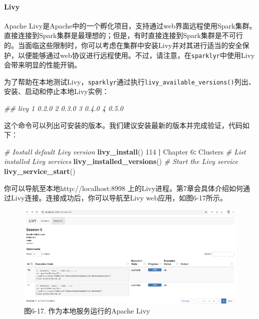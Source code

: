 \documentclass[
]{article}
\newenvironment{Shaded}{\begin{snugshade}}{\end{snugshade}}
\newcommand{\CommentTok}[1]{\textcolor[rgb]{0.56,0.35,0.01}{\textit{#1}}}
\newcommand{\DecValTok}[1]{\textcolor[rgb]{0.00,0.00,0.81}{#1}}
\newcommand{\KeywordTok}[1]{\textcolor[rgb]{0.13,0.29,0.53}{\textbf{#1}}}
\newcommand{\NormalTok}[1]{#1}
\newcommand{\OperatorTok}[1]{\textcolor[rgb]{0.81,0.36,0.00}{\textbf{#1}}}
\newcommand{\StringTok}[1]{\textcolor[rgb]{0.31,0.60,0.02}{#1}}
\begin{document}
\hypertarget{livy}{%
\paragraph{Livy}\label{livy}}

Apache
Livy是Apache中的一个孵化项目，支持通过web界面远程使用Spark集群。直接连接到Spark集群是最理想的；但是，有时直接连接到Spark集群是不可行的。当面临这些限制时，你可以考虑在集群中安装Livy并对其进行适当的安全保护，以便能够通过web协议进行远程使用。不过，请注意，在\texttt{sparklyr}中使用Livy会带来明显的性能开销。

为了帮助在本地测试Livy，\texttt{sparklyr}通过执行\texttt{livy\_available\_versions()}列出、安装、启动和停止本地Livy实例：

\begin{Shaded}
\begin{Highlighting}[]
\CommentTok{## livy 1 0.2.0 2 0.3.0 3 0.4.0 4 0.5.0}
\end{Highlighting}
\end{Shaded}

这个命令可以列出可安装的版本。我们建议安装最新的版本并完成验证，代码如下：

\begin{Shaded}
\begin{Highlighting}[]
\CommentTok{# Install default Livy version}
\KeywordTok{livy_install}\NormalTok{()}
\DecValTok{114} \OperatorTok{|}\StringTok{ }\NormalTok{Chapter }\DecValTok{6}\OperatorTok{:}\StringTok{ }\NormalTok{Clusters}
\CommentTok{# List installed Livy services}
\KeywordTok{livy_installed_versions}\NormalTok{()}
\CommentTok{# Start the Livy service}
\KeywordTok{livy_service_start}\NormalTok{()}
\end{Highlighting}
\end{Shaded}

你可以导航至本地http://localhost:8998
上的Livy进程。第7章会具体介绍如何通过Livy连接。连接成功后，你可以导航至Livy
web应用，如图6-17所示。

\begin{figure}
\centering
\includegraphics{figures/6_17.png}
\caption{图6-17. 作为本地服务运行的Apache Livy}
\end{figure}
\end{document}
